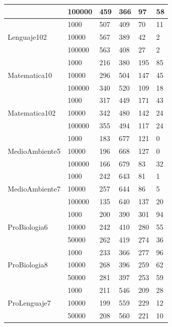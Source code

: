 \begin{longtable}{|p{3cm}|p{3cm}|p{2cm}|p{2cm}|p{2cm}|p{2cm}|}
\cline{2-6}      & 100000 & 459   & 366   & 97    & 58 \\
\hline
\multirow{3}[6]{*}{Lenguaje102} & 1000  & 507   & 409   & 70    & 11 \\
\cline{2-6}      & 10000 & 567   & 389   & 42    & 2 \\
\cline{2-6}      & 100000 & 563   & 408   & 27    & 2 \\
\hline
\multirow{3}[6]{*}{Matematica10} & 1000  & 216   & 380   & 195   & 85 \\
\cline{2-6}      & 10000 & 296   & 504   & 147   & 45 \\
\cline{2-6}      & 100000 & 340   & 520   & 109   & 18 \\
\hline
\multirow{3}[6]{*}{Matematica102} & 1000  & 317   & 449   & 171   & 43 \\
\cline{2-6}      & 10000 & 342   & 480   & 142   & 24 \\
\cline{2-6}      & 100000 & 355   & 494   & 117   & 24 \\
\hline
\multirow{3}[6]{*}{MedioAmbiente5} & 1000  & 183   & 677   & 121   & 0 \\
\cline{2-6}      & 10000 & 196   & 668   & 127   & 0 \\
\cline{2-6}      & 100000 & 166   & 679   & 83    & 32 \\
\hline
\multirow{3}[6]{*}{MedioAmbiente7} & 1000  & 242   & 643   & 81    & 1 \\
\cline{2-6}      & 10000 & 257   & 644   & 86    & 5 \\
\cline{2-6}      & 100000 & 135   & 640   & 137   & 20 \\
\hline
\multirow{3}[6]{*}{ProBiologia6} & 1000  & 200   & 390   & 301   & 94 \\
\cline{2-6}      & 10000 & 242   & 410   & 280   & 55 \\
\cline{2-6}      & 50000 & 262   & 419   & 274   & 36 \\
\hline
\multirow{3}[6]{*}{ProBiologia8} & 1000  & 233   & 366   & 277   & 96 \\
\cline{2-6}      & 10000 & 268   & 396   & 259   & 62 \\
\cline{2-6}      & 50000 & 281   & 397   & 253   & 59 \\
\hline
\multirow{3}[6]{*}{ProLenguaje7} & 1000  & 211   & 546   & 209   & 28 \\
\cline{2-6}      & 10000 & 199   & 559   & 229   & 12 \\
\cline{2-6}      & 50000 & 208   & 560   & 221   & 10 \\

\end{longtable}
